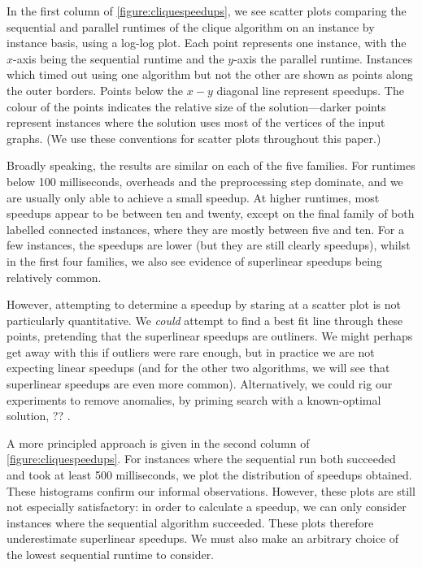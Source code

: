 \documentclass{llncs}
\begin{document}
In the first column of \cref{figure:cliquespeedups}, we see scatter plots comparing the sequential and
parallel runtimes of the clique algorithm on an instance by instance basis, using a log-log plot.
Each point represents one instance, with the $x$-axis being the sequential runtime and the $y$-axis
the parallel runtime.  Instances which timed out using one algorithm but not the other are shown as
points along the outer borders. Points below the $x{-}y$ diagonal line represent speedups. The
colour of the points indicates the relative size of the solution---darker points represent instances
where the solution uses most of the vertices of the input graphs. (We use these conventions for
scatter plots throughout this paper.)

Broadly speaking, the results are similar on each of the five families. For runtimes below 100
milliseconds, overheads and the preprocessing step dominate, and we are usually only able to achieve
a small speedup. At higher runtimes, most speedups appear to be between ten and twenty, except on
the final family of both labelled connected instances, where they are mostly between five and ten.
For a few instances, the speedups are lower (but they are still clearly speedups), whilst in the
first four families, we also see evidence of superlinear speedups being relatively common.

However, attempting to determine a speedup by staring at a scatter plot is not particularly
quantitative. We \emph{could} attempt to find a best fit line through these points, pretending that
the superlinear speedups are outliners. We might perhaps get away with this if outliers were rare
enough, but in practice we are not expecting linear speedups (and for the other two algorithms, we
will see that superlinear speedups are even more common). Alternatively, we could rig our
experiments to remove anomalies, by priming search with a known-optimal
solution, ?? \cite{DBLP:journals/topc/McCreeshP15}.

A more principled approach is given in the second column of \cref{figure:cliquespeedups}. For
instances where the sequential run both succeeded and took at least 500 milliseconds, we plot the
distribution of speedups obtained. These histograms confirm our informal observations. However,
these plots are still not especially satisfactory: in order to calculate a speedup, we can only
consider instances where the sequential algorithm succeeded. These plots therefore underestimate
superlinear speedups. We must also make an arbitrary choice of the lowest sequential runtime to
consider.
\end{document}

